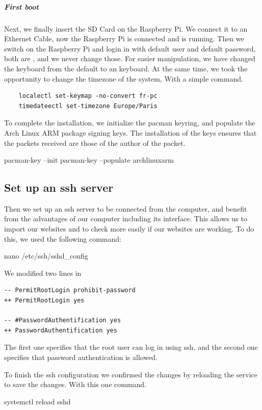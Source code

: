 \documentclass[11pt]{article}
\begin{document}
\subparagraph{First boot}
Next, we finally insert the SD Card on the Raspberry Pi. We connect it to an Ethernet Cable, now the Raspberry Pi is connected and is running.
Then we switch on the Raspberry Pi and login in with default user and default password, both are , and we never change those.
For easier manipulation, we have changed the keyboard from the default  to an  keyboard. At the same time, we took the opportunity to change the timezone of the system, With a simple command.
\begin{verbatim}
    localectl set-keymap -no-convert fr-pc
    timedateectl set-timezone Europe/Paris
\end{verbatim}

To complete the installation, we initialize the pacman keyring, and populate the Arch Linux ARM package signing keys. The installation of the keys ensures that the packets received are those of the author of the packet.
\begin{bash}
    pacman-key --init
    pacman-key --populate archlinuxarm
\end{bash}

\subsection{Set up an ssh server}
Then we set up an ssh server to be connected from the computer, and benefit from the advantages of our computer including its interface. This allows us to import our websites and to check more easily if our websites are working. To do this, we used the following command:

\begin{bash}
    nano /etc/ssh/sshd_config
\end{bash}

We modified two lines in 

\begin{verbatim}
-- PermitRootLogin prohibit-password
++ PermitRootLogin yes

-- #PasswordAuthentification yes
++ PasswordAuthentification yes
\end{verbatim}

The first one specifies that the root user can log in using ssh, and the second one specifies that password authentication is allowed.

To finish the ssh configuration we confirmed the changes by reloading the service to save the changes. With this one command.
\begin{bash}
    systemctl reload sshd
\end{bash}
\end{document}
